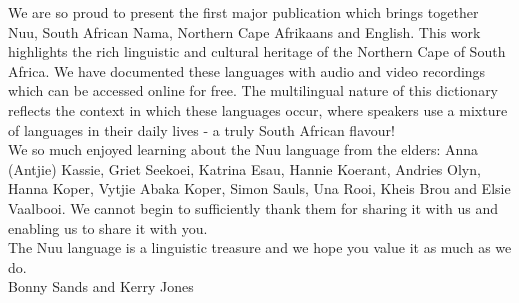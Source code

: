 We are so proud to present the first major publication which brings
together N\textipa{\textvertline}uu, South African Nama, Northern Cape
Afrikaans and English. This work highlights the rich linguistic and
cultural heritage of the Northern Cape of South Africa. We have
documented these languages with audio and video recordings which can
be accessed online for free. The multilingual nature of this
dictionary reflects the context in which these languages occur, where
speakers use a mixture of languages in their daily lives - a truly
South African flavour!\\

We so much enjoyed learning about the N\textipa{\textvertline}uu
language from the elders: Anna (Antjie) Kassie, Griet Seekoei, Katrina
Esau, Hannie Koerant, Andries Olyn, Hanna Koper, Vytjie
\textipa{\textvertline}Abaka Koper, Simon Sauls,
\textipa{\textvertline}Una Rooi, Kheis Brou and Elsie Vaalbooi. We
cannot begin to sufficiently thank them for sharing it with us and
enabling us to share it with you.\\

The N\textipa{\textvertline}uu language is a linguistic treasure and
we hope you value it as much as we do.\\[1em]

\hfill Bonny Sands and Kerry Jones
\vspace{.8cm}

